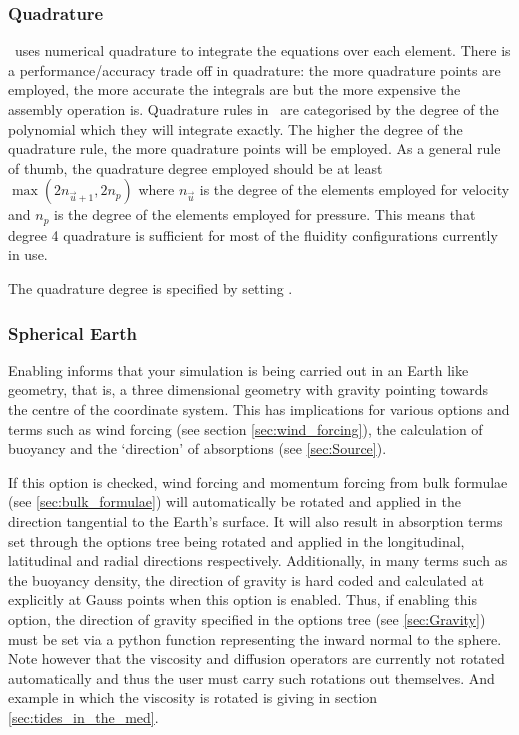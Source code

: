 \subsubsection{Quadrature}
\fluidity\ uses numerical quadrature to integrate the equations over each
element. There is a performance/accuracy trade off in quadrature: the more
quadrature points are employed, the more accurate the integrals are but
the more expensive the assembly operation is. Quadrature rules in \fluidity\ are categorised by the degree of the polynomial which they will integrate
exactly. The higher the degree of the quadrature rule, the more quadrature
points will be employed. As a general rule of thumb, the quadrature
degree employed should be at least $\max(2n_{\vec{u}+1},2n_p)$ where
$n_{\vec{u}}$ is the degree of the elements employed for velocity and $n_p$
is the degree of the elements employed for pressure. This means that degree
4 quadrature is sufficient for most of the fluidity configurations currently
in use.

The quadrature degree is specified by setting .

\subsubsection{Spherical Earth}
\label{sec:spherical_earth}

Enabling  informs \fluidity that your simulation is being carried out in an Earth like geometry, that is, a three dimensional geometry with gravity pointing towards the centre of the coordinate system. This has implications for various options and terms such as wind forcing (see section \ref{sec:wind_forcing}), the calculation of buoyancy and the `direction' of absorptions (see \ref{sec:Source}).

If this option is checked, wind forcing and \eg momentum forcing from bulk formulae (see \ref{sec:bulk_formulae}) will automatically be rotated and applied in the direction tangential to the Earth's surface. It will also result in absorption terms set through the options tree being rotated and applied in the longitudinal, latitudinal and radial directions respectively. Additionally, in many terms such as the buoyancy density, the direction of gravity is hard coded and calculated at explicitly at Gauss points when this option is enabled. Thus, if enabling this option, the direction of gravity specified in the options tree (see \ref{sec:Gravity}) must be set via a python function representing the inward normal to the sphere. Note however that the viscosity and diffusion operators are currently not rotated automatically and thus the user must carry such rotations out themselves. And example in which the viscosity is rotated is giving in section \ref{sec:tides_in_the_med}.

